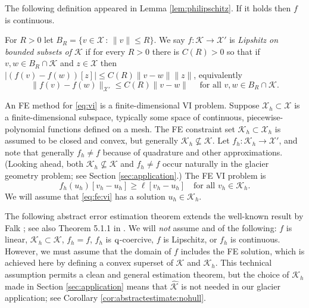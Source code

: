 \documentclass[hidelinks,onefignum,onetabnum,final]{siamart220329}  %
\newcommand{\cK}{\mathcal{K}}
\newcommand{\cX}{\mathcal{X}}
\newcommand{\hcK}{\widehat{\cK}}
\newcommand{\qq}{{\text{\textnormal{q}}}}
\begin{document}
The following definition appeared in Lemma \ref{lem:philipschitz}.  If it holds then $f$ is continuous.

\begin{definition} \label{def:lipshitz}
For $R>0$ let $B_R = \{v\in \cX\,:\,\|v\|\le R\}$.  We say $f:\cK \to \cX'$ is \emph{Lipshitz on bounded subsets of $\cK$} if for every $R>0$ there is $C(R)>0$ so that if $v,w \in B_R \cap \cK$ and $z\in\cX$ then $|\left(f(v)-f(w)\right)[z]| \le C(R) \|v-w\| \|z\|$, equivalently
\begin{equation}
\|f(v)-f(w)\|_{\cX'} \le C(R) \|v-w\| \quad \text{ for all } v,w \in B_R \cap \cK.  \label{eq:liponbounded}
\end{equation}
\end{definition}

An FE method for \eqref{eq:vi} is a finite-dimensional VI problem.  Suppose $\cX_h \subset \cX$ is a finite-dimensional subspace, typically some space of continuous, piecewise-polynomial functions defined on a mesh.  The FE constraint set $\cK_h\subset \cX_h$ is assumed to be closed and convex, but generally $\cK_h \nsubseteq \cK$.  Let $f_h:\cK_h\to\cX'$, and note that generally $f_h\ne f$ because of quadrature and other approximations.  (Looking ahead, both $\cK_h \nsubseteq \cK$ and $f_h\ne f$ occur naturally in the glacier geometry problem; see Section \ref{sec:application}.)  The FE VI problem is
\begin{equation}
f_h(u_h)[v_h-u_h] \ge \ell[v_h-u_h] \quad \text{for all } v_h\in \cK_h. \label{eq:fe:vi}
\end{equation}
We will assume that \eqref{eq:fe:vi} has a solution $u_h\in\cK_h$.

The following abstract error estimation theorem extends the well-known result by Falk \cite{Falk1974}; see also Theorem 5.1.1 in \cite{Ciarlet2002}.  We will \emph{not} assume and of the following: $f$ is linear, $\cK_h \subset \cK$, $f_h=f$, $f_h$ is $\qq$-coercive, $f$ is Lipschitz, or $f_h$ is continuous.  However, we must assume that the domain of $f$ includes the FE solution, which is achieved here by defining a convex superset of $\cK$ and $\cK_h$.  This technical assumption permits a clean and general estimation theorem, but the choice of $\cK_h$ made in Section \ref{sec:application} means that $\hcK$ is not needed in our glacier application; see Corollary \ref{cor:abstractestimate:nohull}.
\end{document}
